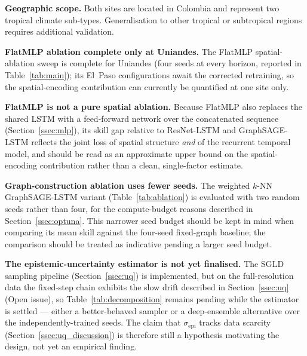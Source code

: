 \textbf{Geographic scope.} Both sites are located in Colombia and represent
two tropical climate sub-types. Generalisation to other tropical or subtropical
regions requires additional validation.

\textbf{FlatMLP ablation complete only at Uniandes.} The FlatMLP
spatial-ablation sweep is complete for Uniandes (four seeds at every horizon,
reported in Table~\ref{tab:main}); its El~Paso configurations await the
corrected retraining, so the spatial-encoding contribution can currently be
quantified at one site only.

\textbf{FlatMLP is not a pure spatial ablation.} Because FlatMLP also
replaces the shared LSTM with a feed-forward network over the concatenated
sequence (Section~\ref{ssec:mlp}), its skill gap relative to ResNet-LSTM and
GraphSAGE-LSTM reflects the joint loss of spatial structure \emph{and} of
the recurrent temporal model, and should be read as an approximate upper
bound on the spatial-encoding contribution rather than a clean, single-factor
estimate.

\textbf{Graph-construction ablation uses fewer seeds.} The weighted $k$-NN
GraphSAGE-LSTM variant (Table~\ref{tab:ablation}) is evaluated with two
random seeds rather than four, for the compute-budget reasons described in
Section~\ref{ssec:optuna}. This narrower seed budget should be kept in mind
when comparing its mean skill against the four-seed fixed-graph baseline;
the comparison should be treated as indicative pending a larger seed budget.

\textbf{The epistemic-uncertainty estimator is not yet finalised.} The SGLD
sampling pipeline (Section~\ref{ssec:uq}) is implemented, but on the
full-resolution data the fixed-step chain exhibits the slow drift described
in Section~\ref{ssec:uq} (Open issue), so Table~\ref{tab:decomposition}
remains pending while the estimator is settled --- either a better-behaved
sampler or a deep-ensemble alternative over the independently-trained seeds.
The claim that $\sigma_\text{epi}$ tracks data scarcity
(Section~\ref{ssec:uq_discussion}) is therefore still a hypothesis motivating
the design, not yet an empirical finding.

